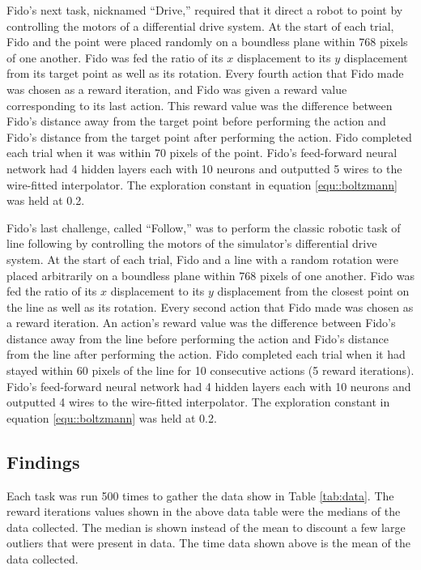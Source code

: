 Fido's next task, nicknamed ``Drive,'' required that it direct a robot to point by controlling the motors of a differential drive system. At the start of each trial, Fido and the point were placed randomly on a boundless plane within 768 pixels of one another. Fido was fed the ratio of its $x$ displacement to its $y$ displacement from its target point as well as its rotation. Every fourth action that Fido made was chosen as a reward iteration, and Fido was given a reward value corresponding to its last action. This reward value was the difference between Fido's distance away from the target point before performing the action and Fido's distance from the target point after performing the action. Fido completed each trial when it was within 70 pixels of the point. Fido's feed-forward neural network had 4 hidden layers each with 10 neurons and outputted 5 wires to the wire-fitted interpolator. The exploration constant in equation \ref{equ::boltzmann} was held at 0.2.

Fido's last challenge, called ``Follow,'' was to perform the classic robotic task of line following by controlling the motors of the simulator's differential drive system. At the start of each trial, Fido and a line with a random rotation were placed arbitrarily on a boundless plane within 768 pixels of one another. Fido was fed the ratio of its $x$ displacement to its $y$ displacement from the closest point on the line as well as its rotation. Every second action that Fido made was chosen as a reward iteration. An action's reward value was the difference between Fido's distance away from the line before performing the action and Fido's distance from the line after performing the action. Fido completed each trial when it had stayed within 60 pixels of the line for 10 consecutive actions (5 reward iterations). Fido's feed-forward neural network had 4 hidden layers each with 10 neurons and outputted 4 wires to the wire-fitted interpolator. The exploration constant in equation \ref{equ::boltzmann} was held at 0.2.

\subsection{Findings}

Each task was run 500 times to gather the data show in Table \ref{tab:data}.  The reward iterations values shown in the above data table were the medians of the data collected. The median is shown instead of the mean to discount a few large outliers that were present in data. The time data shown above is the mean of the data collected.

